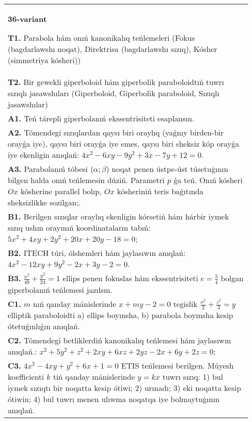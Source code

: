 \documentclass{article}
\begin{document}
\begin{tabular}{m{17cm}}
\textbf{36-variant}
\newline

\textbf{T1.} Parabola hám onıń kanonikalıq teńlemeleri (Fokus (bagdarlawshı noqat), Direktrisa (bagdarlawshı sızıq), Kósher (simmetriya kósheri)) \\
\textbf{T2.} Bir gewekli giperboloid hám giperbolik paraboloidtıń tuwrı sızıqlı jasawshıları (Giperboloid, Giperbolik paraboloid, Sızıqlı jasawshılar) \\
\textbf{A1.} Teń tárepli giperbolanıń ekssentrisiteti esaplansın. \\
\textbf{A2.} Tómendegi sızıqlardan qaysı biri oraylıq (yaǵnıy birden-bir orayǵa iye), qaysı biri orayǵa iye emes, qaysı biri sheksiz kóp orayǵa iye ekenligin anıqlań:  $4 x^2-6 x y-9 y^2+3 x-7 y+12=0$. \\
\textbf{A3.} Parabolanıń tóbesi ($\alpha;\beta$) noqat penen ústpe-úst túsetuģının bilgen halda onıń teńlemesin dúziń. Parametri $p$ ǵa teń. Onıń kósheri $O x$ kósherine parallel bolıp, $O x$ kósheriniń teris baǵıtında sheksizlikke sozilgan;. \\
\textbf{B1.} Berilgen sızıqlar oraylıq ekenligin kórsetiń hám hárbir iymek sızıq ushın orayınıń koordinataların tabıń:$5 x^2+4 x y+2 y^2+20 x+20 y-18=0$; \\
\textbf{B2.} ITECH túri, ólshemleri hám jaylasıwın anıqlań: $4 x^2-12 x y+9 y^2-2 x+3 y-2=0$. \\
\textbf{B3.} $\frac{x^2}{49}+\frac{y^2}{24}=1$ ellips penen fokuslas hám ekssentrisiteti $e=\frac{5}{4}$ bolgan giperbolanıń teńlemesi jazılsın. \\
\textbf{C1.} $m$ nıń qanday mánislerinde $x+m y-2=0$ tegislik $\frac{x^2}{2}+\frac{z^2}{3}=y$ elliptik paraboloidti a) ellips boyınsha, b) parabola boyınsha kesip ótetuǵınlıǵın anıqlań. \\
\textbf{C2.} Tómendegi betliklerdiń kanonikalıq teńlemesi hám jaylasıwın anıqlań.: $x^2+5 y^2+z^2+2 x y+6 x z+2 y z-2 x+6 y+2 z=0$; \\
\textbf{C3.} $4 x^2-4 x y+y^2+6 x+1=0$ ETIS teńlemesi berilgen. Múyesh koefficienti $k$ tiń qanday mánislerinde $y=kx$ tuwrı sızıq: 1) bul iymek sızıqtı bir noqatta kesip ótiwi; 2) urınadı; 3) eki noqatta kesip ótiwin; 4) bul tuwrı menen ulıwma noqatqa iye bolmaytuģının anıqlań. \\

\end{tabular}
\vspace{1cm}
\end{document}
